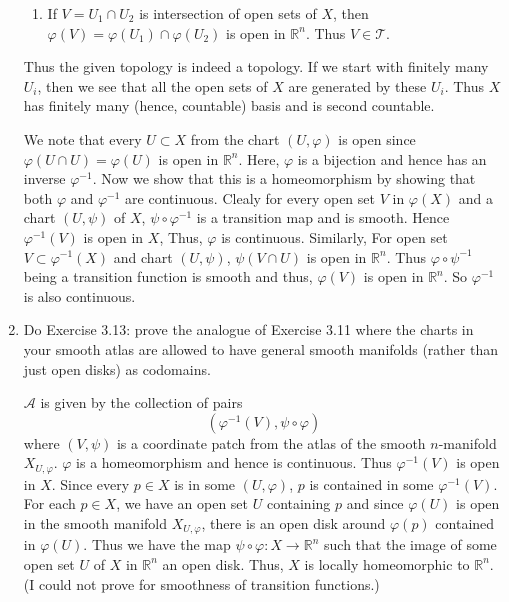 \documentclass[12pt]{article}
\newcommand{\rl}{\mathbb{R}}
\newcommand{\atlasA}{\mathcal{A}}
\begin{document}
\begin{enumerate}
\begin{mybox}
\begin{enumerate}
        \item If $V=U_1\cap U_2$ is intersection of open
        sets of $X$, then $\varphi(V)=\varphi(U_1)\cap
        \varphi(U_2)$ is open in $\rl^n$. Thus
        $V\in\mathscr{T}$.
    \end{enumerate}
    Thus the given topology is indeed a topology. If we
    start with finitely many $U_i$, then we see that all the
    open sets of $X$ are generated by these $U_i$. Thus $X$
    has finitely many (hence, countable) basis and is
    second countable.

    \vspace*{2mm}
    We note that every $U \subset X$ from the chart
    $(U,\varphi)$
    is open since $\varphi(U\cap U)=\varphi(U)$ is open
    in $\rl^n$. Here, $\varphi$ is a bijection and hence has
    an inverse $\varphi^{-1}$. Now we show that this is a
    homeomorphism by showing that both $\varphi$ and
    $\varphi^{-1}$ are continuous. Clealy for every open set
    $V$ in $\varphi(X)$ and a chart $(U,\psi)$ of $X$,
    $\psi\circ\varphi^{-1}$ is a transition map and is smooth.
    Hence $\varphi^{-1}(V)$ is open in $X$, Thus, $\varphi$
    is continuous. Similarly, For open set $V\subset
    \varphi^{-1}(X)$ and chart $(U,\psi)$, $\psi(V\cap U)$
    is open in $\rl^n$. Thus $\varphi\circ\psi^{-1}$
    being a transition function is smooth and thus,
    $\varphi(V)$ is open in $\rl^n$. So $\varphi^{-1}$ is
    also continuous.

\end{mybox}
 
 
\item Do Exercise 3.13: prove the analogue of Exercise
    3.11 where the charts in your smooth atlas are allowed
    to have general smooth manifolds (rather than just
    open disks) as codomains.

\begin{mybox}

    $\atlasA$ is given by the collection of pairs
    $$(\varphi^{-1}(V),\psi\circ\varphi)$$
    where $(V,\psi)$ is a coordinate patch from the atlas
    of the smooth $n$-manifold $X_{U,\varphi}$. $\varphi$ is
    a homeomorphism and hence is continuous. Thus $\varphi^{-1}
    (V)$ is open in $X$. Since
    every $p\in X$ is in some $(U,\varphi)$, $p$ is contained
    in some $\varphi^{-1}(V)$. For each $p\in X$, we have
    an open set $U$ containing $p$ and since $\varphi(U)$ is
    open in the smooth manifold $X_{U,\varphi}$, there is
    an open disk around $\varphi(p)$ contained in $\varphi(U)$.
    Thus we have the map
    $\psi\circ\varphi:X\to\rl^n$ such that the image of
    some open set $U$ of $X$ in $\rl^n$
    an open disk. Thus, $X$ is locally homeomorphic to
    $\rl^n$. (I could not prove for smoothness of transition
    functions.)


\end{mybox}
\end{enumerate}
\end{document}
